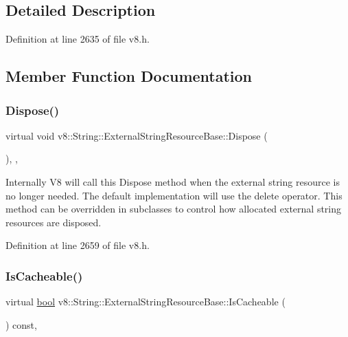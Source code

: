 \subsection{Detailed Description}


Definition at line 2635 of file v8.\+h.



\subsection{Member Function Documentation}
\mbox{\label{classv8_1_1String_1_1ExternalStringResourceBase_af4720342ae31e1ab4656df3f15d069c0}} 
\subsubsection{\texorpdfstring{Dispose()}{Dispose()}}
{\footnotesize\ttfamily virtual void v8\+::\+String\+::\+External\+String\+Resource\+Base\+::\+Dispose (\begin{DoxyParamCaption}{ }\end{DoxyParamCaption})\hspace{0.3cm}{\ttfamily [inline]}, {\ttfamily [protected]}, {\ttfamily [virtual]}}

Internally V8 will call this Dispose method when the external string resource is no longer needed. The default implementation will use the delete operator. This method can be overridden in subclasses to control how allocated external string resources are disposed. 

Definition at line 2659 of file v8.\+h.

\mbox{\label{classv8_1_1String_1_1ExternalStringResourceBase_a994c7580185c831abd45075d297dd07c}} 
\subsubsection{\texorpdfstring{Is\+Cacheable()}{IsCacheable()}}
{\footnotesize\ttfamily virtual \mbox{\hyperlink{classbool}{bool}} v8\+::\+String\+::\+External\+String\+Resource\+Base\+::\+Is\+Cacheable (\begin{DoxyParamCaption}{ }\end{DoxyParamCaption}) const\hspace{0.3cm}{\ttfamily [inline]}, {\ttfamily [virtual]}}

